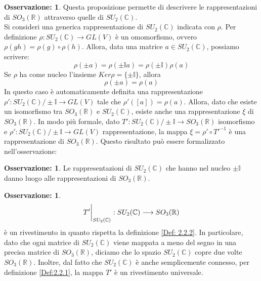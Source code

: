 \documentclass[12pt,a4paper]{report}
\theoremstyle{definition}
\theoremstyle{Theorem}
\theoremstyle{definition}
\theoremstyle{definition}
\theoremstyle{definition}
\newtheorem{Obs}[Def]{Osservazione:}
\begin{document}
\begin{Obs} \label{Obs:3.5.1}
	Questa proposizione permette di descrivere le rappresentazioni di $SO_3(\mathbb{R})$ attraverso quelle di $SU_2(\mathbb{C})$. \\
	Si consideri una generica rappresentazione di $SU_2(\mathbb{C})$ indicata con $\rho$. Per definizione $\rho:SU_2(\mathbb{C})\rightarrow GL(V)$ è un omomorfismo, ovvero $\rho(gh)=\rho(g)\circ\rho(h)$. Allora, data una matrice $a\in SU_2(\mathbb{C})$, possiamo scrivere:
	$$\rho(\pm a)=\rho(\pm \mathbb{I}a)=\rho(\pm\mathbb{I})\rho(a)$$
	Se $\rho$ ha come nucleo l'insieme $Ker\rho=\{\pm\mathbb{I}\}$, allora
	$$\rho(\pm a)=\rho(a)$$
	In questo caso è automaticamente definita una rappresentazione $\rho':SU_2(\mathbb{C})/\pm\mathbb{I}\longrightarrow GL(V)$ tale che $\rho'([a])=\rho(a)$.
	Allora, dato che esiste un isomorfismo tra $SO_3(\mathbb{R})$ e $SU_2(\mathbb{C})$, esiste anche una rappresentazione $\xi$ di $SO_3(\mathbb{R})$. In modo più formale, dato $T':SU_2(\mathbb{C})/\pm\mathbb{I}\rightarrow SO_3(\mathbb{R})$ isomorfismo e $\rho':SU_2(\mathbb{C})/\pm\mathbb{I}\longrightarrow GL(V)$ rappresentazione, la mappa $\xi=\rho'\circ T'^{-1}$ è una rappresentazione di $SO_3(\mathbb{R})$.
	Questo risultato può essere formalizzato nell'osservazione:
\end{Obs}
\begin{Obs}
	Le rappresentazioni di $SU_2(\mathbb{C})$ che hanno nel nucleo $\pm\mathbb{I}$ danno luogo alle rappresentazioni di $SO_3(\mathbb{R})$. 
\end{Obs}
\begin{Obs}
	 $$T'\bigg{\rvert}_{SU_2(\mathbb{C})}:SU_2(\mathbb{C})\longrightarrow SO_3(\mathbb{R})$$
	 è un rivestimento in quanto rispetta la definizione \ref{Def: 2.2.2}. In particolare, dato che ogni matrice di $SU_2(\mathbb{C})$ viene mappata a meno del segno in una precisa matrice di $SO_3(\mathbb{R})$, diciamo che lo spazio $SU_2(\mathbb{C})$ copre due volte $SO_3(\mathbb{R})$. Inoltre, dal fatto che $SU_2(\mathbb{C})$ è anche semplicemente connesso, per definizione \ref{Def:2.2.1}, la mappa $T'$ è un rivestimento universale.
\end{Obs}
\end{document}
